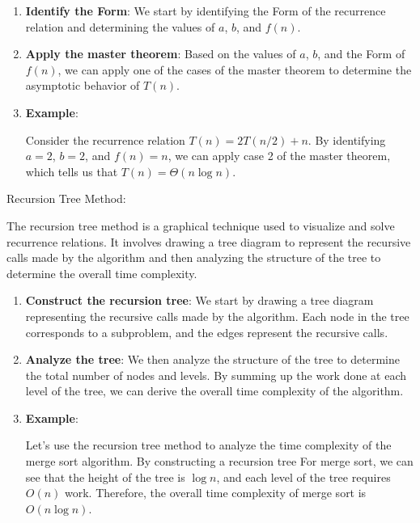 \documentclass[12pt]{book} %
\begin{document}
\begin{enumerate}
    \item \textbf{Identify the Form}: We start by identifying the Form of the recurrence relation and determining the values of \(a\), \(b\), and \(f(n)\).
    
    \item \textbf{Apply the master theorem}: Based on the values of \(a\), \(b\), and the Form of \(f(n)\), we can apply one of the cases of the master theorem to determine the asymptotic behavior of \(T(n)\).
    
    \item \textbf{Example}:
    
    Consider the recurrence relation \(T(n) = 2T(n/2) + n\). By identifying \(a = 2\), \(b = 2\), and \(f(n) = n\), we can apply case 2 of the master theorem, which tells us that \(T(n) = \Theta(n \log n)\).
\end{enumerate}
\FloatBarrier
Recursion Tree Method:
\FloatBarrier

The recursion tree method is a graphical technique used to visualize and solve recurrence relations. It involves drawing a tree diagram to represent the recursive calls made by the algorithm and then analyzing the structure of the tree to determine the overall time complexity.

\begin{enumerate}
    \item \textbf{Construct the recursion tree}: We start by drawing a tree diagram representing the recursive calls made by the algorithm. Each node in the tree corresponds to a subproblem, and the edges represent the recursive calls.
    
    \item \textbf{Analyze the tree}: We then analyze the structure of the tree to determine the total number of nodes and levels. By summing up the work done at each level of the tree, we can derive the overall time complexity of the algorithm.
    
    \item \textbf{Example}:
    
    Let's use the recursion tree method to analyze the time complexity of the merge sort algorithm. By constructing a recursion tree For merge sort, we can see that the height of the tree is \(\log n\), and each level of the tree requires \(O(n)\) work. Therefore, the overall time complexity of merge sort is \(O(n \log n)\).
\end{enumerate}
\end{document}
